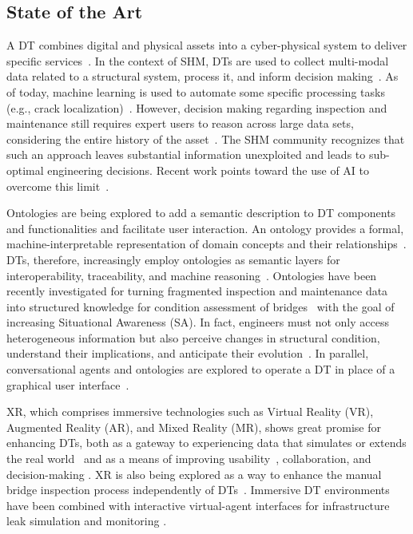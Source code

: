 \documentclass[12pt,a4paper]{article}
\begin{document}
\subsection{State of the Art}
A DT combines digital and physical assets into a cyber-physical system to deliver specific services~\cite{fitzgerald_engineering_2024}. In the context of SHM, DTs are used to collect multi-modal data related to a structural system, process it, and inform decision making~\cite{talasila_digital_2026}. As of today, machine learning is used to automate some specific processing tasks (e.g., crack localization)~\cite{hoskere_unified_2025}. However, decision making regarding inspection and maintenance still requires expert users to reason across large data sets, considering the entire history of the asset~\cite{celik_vision_2026}. The SHM community recognizes that such an approach leaves substantial information unexploited and leads to sub-optimal engineering decisions. Recent work points toward the use of AI to overcome this limit~\cite{luo_chattwin_2026}.\par
Ontologies are being explored to add a semantic description to DT components and functionalities and facilitate user interaction. An ontology provides a formal, machine-interpretable representation of domain concepts and their relationships~\cite{ghidalia_combining_2024}. DTs, therefore, increasingly employ ontologies as semantic layers for interoperability, traceability, and machine reasoning~\cite{li_comprehensive_2024,jakel_system_2025}. Ontologies have been recently investigated for turning fragmented inspection and maintenance data into structured knowledge for condition assessment of bridges~\cite{jiang_machine_2023,li_human---loop_2026} with the goal of increasing Situational Awareness (SA). In fact, engineers must not only access heterogeneous information but also perceive changes in structural condition, understand their implications, and anticipate their evolution~\cite{lappalainen_user_2024}. In parallel, conversational agents and ontologies are explored to operate a DT in place of a graphical user interface~\cite{li_human---loop_2026}. \par
XR, which comprises immersive technologies such as Virtual Reality (VR), Augmented Reality (AR), and Mixed Reality (MR), shows great promise for enhancing DTs, both as a gateway to experiencing data that simulates or extends the real world~\cite{pandey2025digital} and as a means of improving usability~\cite{vona2025user}, collaboration, and decision-making \cite{sthapit2026digital}. XR is also being explored as a way to enhance the manual bridge inspection process independently of DTs~\cite{smith_wearable_2022, gabbard_inspectar_2025}. Immersive DT environments have been combined with interactive virtual-agent interfaces for infrastructure leak simulation and monitoring \cite{marzban_immersive_2025}.\par
\end{document}
